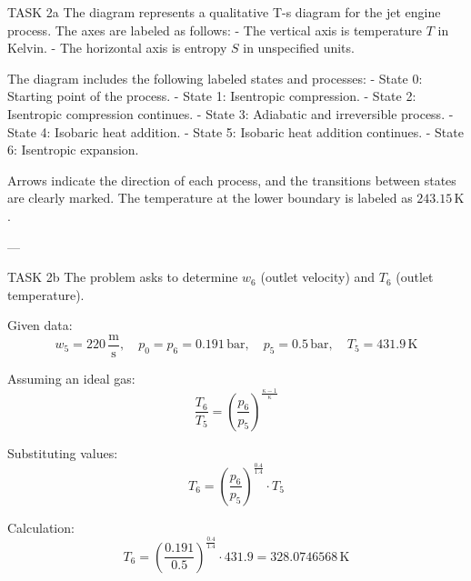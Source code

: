 TASK 2a  
The diagram represents a qualitative T-s diagram for the jet engine process. The axes are labeled as follows:  
- The vertical axis is temperature \( T \) in Kelvin.  
- The horizontal axis is entropy \( S \) in unspecified units.  

The diagram includes the following labeled states and processes:  
- State 0: Starting point of the process.  
- State 1: Isentropic compression.  
- State 2: Isentropic compression continues.  
- State 3: Adiabatic and irreversible process.  
- State 4: Isobaric heat addition.  
- State 5: Isobaric heat addition continues.  
- State 6: Isentropic expansion.  

Arrows indicate the direction of each process, and the transitions between states are clearly marked. The temperature at the lower boundary is labeled as \( 243.15 \, \text{K} \).  

---

TASK 2b  
The problem asks to determine \( w_6 \) (outlet velocity) and \( T_6 \) (outlet temperature).  

Given data:  
\[
w_5 = 220 \, \frac{\text{m}}{\text{s}}, \quad p_0 = p_6 = 0.191 \, \text{bar}, \quad p_5 = 0.5 \, \text{bar}, \quad T_5 = 431.9 \, \text{K}
\]

Assuming an ideal gas:  
\[
\frac{T_6}{T_5} = \left( \frac{p_6}{p_5} \right)^{\frac{\kappa - 1}{\kappa}}
\]

Substituting values:  
\[
T_6 = \left( \frac{p_6}{p_5} \right)^{\frac{0.4}{1.4}} \cdot T_5
\]

Calculation:  
\[
T_6 = \left( \frac{0.191}{0.5} \right)^{\frac{0.4}{1.4}} \cdot 431.9 = 328.0746568 \, \text{K}
\]